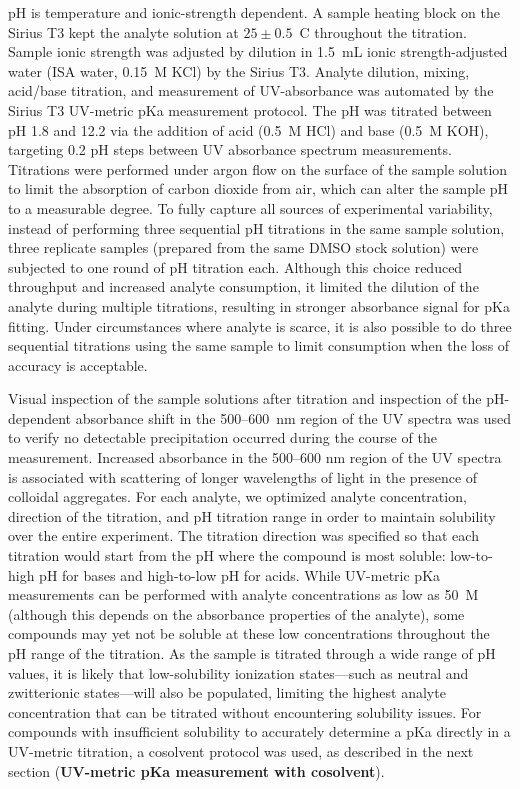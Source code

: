 \documentclass[9pt,lineno]{elife}
\begin{document}
pH is temperature and ionic-strength dependent. 
A sample heating block on the Sirius T3 kept the analyte solution at $25 \pm 0.5$~\textdegree C throughout the titration. 
Sample ionic strength was adjusted by dilution in 1.5~mL ionic strength-adjusted water (ISA water, 0.15~M KCl) by the Sirius T3.  
Analyte dilution, mixing, acid/base titration, and measurement of UV-absorbance was automated by the Sirius T3 UV-metric pKa measurement protocol. 
The pH was titrated between pH 1.8 and 12.2 via the addition of acid (0.5~M HCl) and base (0.5~M KOH), targeting 0.2 pH steps between UV absorbance spectrum measurements. 
Titrations were performed under argon flow on the surface of the sample solution to limit the absorption of carbon dioxide from air, which can alter the sample pH to a measurable degree. 
To fully capture all sources of experimental variability, instead of performing three sequential pH titrations in the same sample solution, three replicate samples (prepared from the same DMSO stock solution) were subjected to one round of pH titration each. 
Although this choice reduced throughput and increased analyte consumption, it limited the dilution of the analyte during multiple titrations, resulting in stronger absorbance signal for pKa fitting. Under circumstances where analyte is scarce, it is also possible to do three sequential titrations using the same sample to limit consumption when the loss of accuracy is acceptable. 

Visual inspection of the sample solutions after titration and inspection of the pH-dependent absorbance shift in the 500--600~nm region of the UV spectra was used to verify no detectable precipitation occurred during the course of the measurement. 
Increased absorbance in the 500--600 nm region of the UV spectra is associated with scattering of longer wavelengths of light in the presence of colloidal aggregates. 
For each analyte, we optimized analyte concentration, direction of the titration, and pH titration range in order to maintain solubility over the entire experiment. 
The titration direction was specified so that each titration would start from the pH where the compound is most soluble: low-to-high pH for bases and high-to-low pH for acids. 
While UV-metric pKa measurements can be performed with analyte concentrations as low as 50~{\micro}M (although this depends on the absorbance properties of the analyte), some compounds may yet not be soluble at these low concentrations throughout the pH range of the titration. 
As the sample is titrated through a wide range of pH values, it is likely that low-solubility ionization states---such as neutral and zwitterionic states---will also be populated, limiting the highest analyte concentration that can be titrated without encountering solubility issues.  
For compounds with insufficient solubility to accurately determine a pKa directly in a UV-metric titration, a cosolvent protocol was used, as described in the next section ({\bf UV-metric pKa measurement with cosolvent}). 
\end{document}
